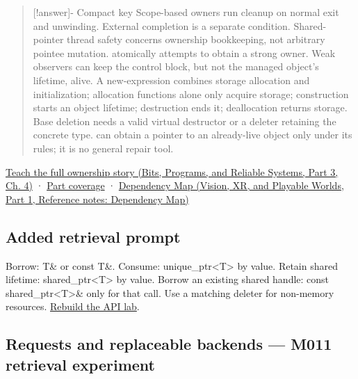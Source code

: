 \begin{quote}
{[}!answer{]}- Compact key Scope-based owners run cleanup on normal exit and unwinding. External completion is a separate condition. Shared-pointer thread safety concerns ownership bookkeeping, not arbitrary pointee mutation.  atomically attempts to obtain a strong owner. Weak observers can keep the control block, but not the managed object's lifetime, alive. A new-expression combines storage allocation and initialization; allocation functions alone only acquire storage; construction starts an object lifetime; destruction ends it; deallocation returns storage. Base deletion needs a valid virtual destructor or a deleter retaining the concrete type.  can obtain a pointer to an already-live object only under its rules; it is no general repair tool.
\end{quote}

\href{../01-Bits-Programs-and-Reliable-Systems-P03/main.pdf\#nameddest=01-foundations-i-ch004-from-a-live-object-to-responsible-resource-ownership}{Teach the full ownership story (Bits, Programs, and Reliable Systems, Part 3, Ch. 4)} · \hyperref[appendix-fd090d982a15-m010---parts-148-160]{Part coverage} · \href{../07-Vision-XR-and-Playable-Worlds-P01/main.pdf\#nameddest=appendix-4ad47bdd269a}{Dependency Map (Vision, XR, and Playable Worlds, Part 1, Reference notes: Dependency Map)}

\subsection{Added retrieval prompt}\label{appendix-960160274237-added-retrieval-prompt}

\hypertarget{appendix-960160274237-added-retrieval-prompt}{}

Borrow: T\& or const T\&. Consume: unique\_ptr\textless T\textgreater{} by value. Retain shared lifetime: shared\_ptr\textless T\textgreater{} by value. Borrow an existing shared handle: const shared\_ptr\textless T\textgreater{}\& only for that call. Use a matching deleter for non-memory resources. \hyperref[01-foundations-i-ch003-worked-api-choice-borrow-consume-retain-or-copy-a-value]{Rebuild the API lab}.

\subsection{Requests and replaceable backends --- M011 retrieval experiment}\label{appendix-960160274237-requests-and-replaceable-backends-m011-retrieval-experiment}

